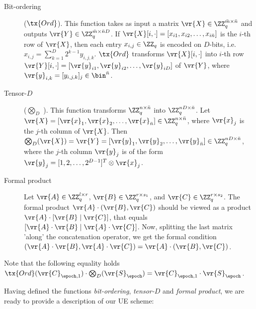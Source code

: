 \documentclass{fundam}
\begin{document}
\begin{description}
	
	\item[{Bit-ordering}] {($\tx{Ord}$)}. This function takes as input a matrix $\vr{X}\in \ZZ_{q}^{\bar{m}\times \bar{n}}$ and outputs $\vr{Y}\in \ZZ_{q}^{\bar{m}\times \bar{n}D}$. If $\vr{X}[i,\cdot]=[{x}_{i1}, {x}_{i2}, \ldots , {x}_{i\bar{n}}]$ is the $i$-th row of $\vr{X}$, then each entry ${x}_{i,j}\in\ZZ_{q}$ is encoded on $D$-bits, i.e. ${x}_{i,j}=\sum_{k=1}^{D}2^{k-1}y_{i,j,k}$. $\tx{Ord}$ transforms $\vr{X}[i,\cdot]$ into $i$-th row $\vr{Y}[i,\cdot]=[\vr{y}_{i1}, \vr{y}_{i2}, \ldots , \vr{y}_{iD}]$ of $\vr{Y}$, where $\vr{y}_{i,k}=[y_{i,j,k}]_{j}\in\bin^{\bar{n}}$.
	
	\item[Tensor-$D$] ($\bigotimes_{D}$  ). This function transforms $\ZZ_{q}^{n\times \bar{n}}$ into $\ZZ_{q}^{nD\times \bar{n}}$. Let $\vr{X} =[\vr{x}_{1}, \vr{x}_{2}, \ldots , \vr{x}_{\bar{n}}]\in \ZZ_{q}^{n\times \bar{n}}$, where $\vr{x}_{j}$ is the $j$-th column of $\vr{X}$. Then $\bigotimes_{D}(\vr{X}) = \vr{Y}=[\vr{y}_{1}, \vr{y}_{2}, \ldots , \vr{y}_{\bar{n}}]\in \ZZ_{q}^{nD\times \bar{n}}$, where the $j$-th column $\vr{y}_{j}$ is of the form $\vr{y}_{j}=[1, 2, \ldots , 2^{D-1}]^{T}\otimes \vr{x}_{j}$.
	
	\item[Formal product] Let $\vr{A}\in\ZZ_{q}^{l\times r}$, $\vr{B}\in\ZZ_{q}^{r\times s_{1}}$, and $\vr{C}\in\ZZ_{q}^{r\times s_{2}}$. The formal product $\vr{A}\cdot (\vr{B},\vr{C})$ should be viewed as a product $\vr{A}\cdot [\vr{B}\mid \vr{C}]$, that equals $[\vr{A}\cdot \vr{B}\mid \vr{A}\cdot \vr{C}]$. Now, splitting the last matrix 'along' the concatenation operator, we get the formal condition $(\vr{A}\cdot \vr{B},  \vr{A}\cdot \vr{C}) = \vr{A}\cdot (\vr{B},\vr{C})$. 
\end{description}

\begin{remark}
Note that the following equality holds
$\tx{Ord}(\vr{C}_{\epoch , 1})\cdot \bigotimes_{D} (\vr{S}_{\epoch}) = \vr{C}_{\epoch , 1}\cdot \vr{S}_{\epoch}$.
\end{remark}	


Having defined the functions \textit{bit-ordering}, \textit{tensor-$D$} and \textit{formal product}, we are ready to provide a description of our UE scheme:
\end{document}
